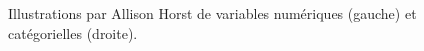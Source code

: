\documentclass[
  11pt,
  letterpaper,
]{book}
\theoremstyle{definition}
\theoremstyle{remark}
\begin{document}
\begin{figure}

\begin{minipage}[t]{0.45\linewidth}

{\centering 


}

\end{minipage}%
%
\begin{minipage}[t]{0.55\linewidth}

{\centering 


}

\end{minipage}%

\caption{\label{fig-types-variables}Illustrations par Allison Horst de
variables numériques (gauche) et catégorielles (droite).}

\end{figure}
\end{document}
